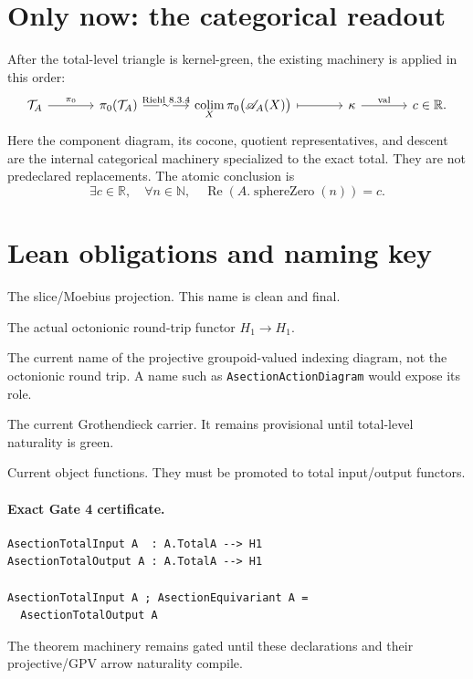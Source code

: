 \documentclass[11pt]{article}
\newcommand{\RR}{\mathbb R}
\newcommand{\cA}{\mathscr A_A}
\newcommand{\TA}{\mathcal T_A}
\begin{document}
\section{Only now: the categorical readout}

After the total-level triangle is kernel-green, the existing machinery is
applied in this order:
\[
\begin{tikzcd}[column sep=large]
  \TA
    \arrow[r,"\pi_0"]
  & \pi_0(\TA)
    \arrow[r,"\sim" description,
      "\text{Riehl 8.3.4}"]
  & \displaystyle
    \operatorname*{colim}_{X}
      \pi_0\bigl(\cA(X)\bigr)
    \arrow[r,mapsto]
  & \kappa
    \arrow[r,"\operatorname{val}"]
  & c\in\RR .
\end{tikzcd}
\]
Here the component diagram, its cocone, quotient representatives, and
descent are the internal categorical machinery specialized to the exact
total.  They are not predeclared replacements.  The atomic conclusion is
\[
  \exists c\in\RR,\quad
  \forall n\in\mathbb N,\quad
  \operatorname{Re}(A.\operatorname{sphereZero}(n))=c.
\]

\section{Lean obligations and naming key}

\begin{description}[leftmargin=3.3cm,style=nextline]
  \item[\texttt{AsectionSlice}]
    The slice/Moebius projection.  This name is clean and final.
  \item[\texttt{AsectionEquivariant}]
    The actual octonionic round-trip functor $H_1\to H_1$.
  \item[\texttt{AsectionFunctor}]
    The current name of the projective groupoid-valued indexing diagram,
    not the octonionic round trip.  A name such as
    \texttt{AsectionActionDiagram} would expose its role.
  \item[\texttt{TotalA}]
    The current Grothendieck carrier.  It remains provisional until
    total-level naturality is green.
  \item[\texttt{totalInput}/\texttt{totalOutput}]
    Current object functions.  They must be promoted to total input/output
    functors.
\end{description}

\paragraph{Exact Gate 4 certificate.}
\begin{verbatim}
AsectionTotalInput A  : A.TotalA --> H1
AsectionTotalOutput A : A.TotalA --> H1

AsectionTotalInput A ; AsectionEquivariant A =
  AsectionTotalOutput A
\end{verbatim}
The theorem machinery remains gated until these declarations and their
projective/GPV arrow naturality compile.
\end{document}
